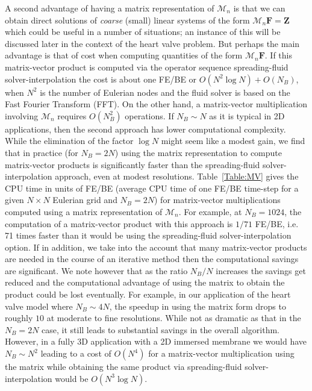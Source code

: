 \documentclass[preprint,12pt]{elsarticle}
\begin{document}
 A second advantage of having a matrix representation of $\mathcal{M}_n$ is that we can obtain direct solutions of {\em coarse} (small) linear systems of the form $\mathcal{M}_n\mathbf{F}=\mathbf{Z}$ which could be useful in a number of situations; an instance of this will be discussed later in the context of the heart valve problem. But perhaps the main advantage is that of cost when 
 computing quantities of the form  $\mathcal{M}_n\mathbf{F}$.  If this matrix-vector product is computed via the operator sequence  spreading-fluid solver-interpolation the cost is about one FE/BE or $O(N^2\log N) + O(N_B)$, when $N^2$ is the number of Eulerian nodes and the fluid solver is based on the Fast Fourier Transform (FFT).  
 On the other hand, a matrix-vector multiplication involving $\mathcal{M}_n$ requires $O(N_B^2)$ operations.  If  $N_B \sim N$ as it is typical in 2D applications, then the second approach has lower computational complexity. While
 the elimination of the factor $\log N$ might seem like a modest gain, we find that in practice (for $N_B=2N$) using the 
 matrix representation to compute matrix-vector products is significantly faster  than the spreading-fluid solver-interpolation approach, even at modest resolutions.  Table~\ref{Table:MV} gives the CPU time in units of FE/BE (average CPU time of one FE/BE time-step for a given $N\times N$ Eulerian grid and $N_B=2N$) for matrix-vector multiplications computed using a matrix representation of  $\mathcal{M}_n$.  For example, at $N_B=1024$,  the computation of a matrix-vector product with this approach is $1/71$ FE/BE, i.e.
  71 times faster than it would be using the spreading-fluid solver-interpolation option.
  If in addition,  we take into the account that many matrix-vector products are needed in the course of an iterative method then the computational savings are significant. We note however that as the ratio $N_B/N$ increases the savings get reduced and the computational advantage of using the matrix to obtain the product could be lost eventually. For example, in our application of the heart valve model where $N_B  \sim 4N$, the speedup in using the matrix form drops to roughly $10$ at moderate to fine resolutions. While not as dramatic as that in the $N_B=2N$ case, it still leads to substantial savings in the overall algorithm.  However, 
  in a fully 3D application with a 2D immersed membrane we would have $N_B \sim N^2$ leading to a cost of  $O(N^4)$ for 
   a matrix-vector multiplication using the matrix  while obtaining the same product via spreading-fluid solver-interpolation would be $O(N^3\log N)$. 
  
\end{document}
